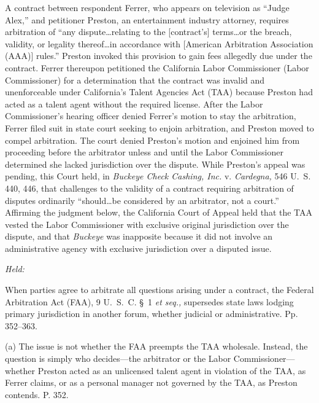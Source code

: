 
\setcounter{page}{346}

\noindent A contract between respondent Ferrer, who appears on television as
``Judge Alex,'' and petitioner Preston, an entertainment industry
attorney, requires arbitration of ``any dispute\dots relating to
the [contract's] terms\dots or the breach, validity, or legality
thereof\dots in accordance with [American Arbitration Association
(AAA)] rules.'' Preston invoked this provision to gain fees allegedly
due under the contract. Ferrer thereupon petitioned the California
Labor Commissioner (Labor Commissioner) for a determination that the
contract was invalid and unenforceable under California's Talent
Agencies Act (TAA) because Preston had acted as a talent agent without
the required license. After the Labor Commissioner's hearing officer
denied Ferrer's motion to stay the arbitration, Ferrer filed suit in
state court seeking to enjoin arbitration, and Preston moved to compel
arbitration. The court denied Preston's motion and enjoined him from
proceeding before the arbitrator unless and until the Labor Commissioner
determined she lacked jurisdiction over the dispute. While Preston's
appeal was pending, this Court held, in \emph{Buckeye Check Cashing,
Inc.} v. \emph{Cardegna,} 546 U.~S. 440, 446, that challenges to the
validity of a contract requiring arbitration of disputes ordinarily
``should\dots be considered by an arbitrator, not a court.''
Affirming the judgment below, the California Court of Appeal held
that the TAA vested the Labor Commissioner with exclusive original
jurisdiction over the dispute, and that \emph{Buckeye} was inapposite
because it did not involve an administrative agency with exclusive
jurisdiction over a disputed issue.

\emph{Held:}

\noindent When parties agree to arbitrate all questions arising under a contract,
the Federal Arbitration Act (FAA), 9 U.~S.~C. \S~1 \emph{et seq.,}
supersedes state laws lodging primary jurisdiction in another forum,
whether judicial or administrative. Pp. 352--363.

  (a) The issue is not whether the FAA preempts the TAA wholesale.
Instead, the question is simply who decides---the arbitrator or the
Labor Commissioner---whether Preston acted as an unlicensed talent agent
in violation of the TAA, as Ferrer claims, or as a personal manager not
governed by the TAA, as Preston contends. P. 352.

